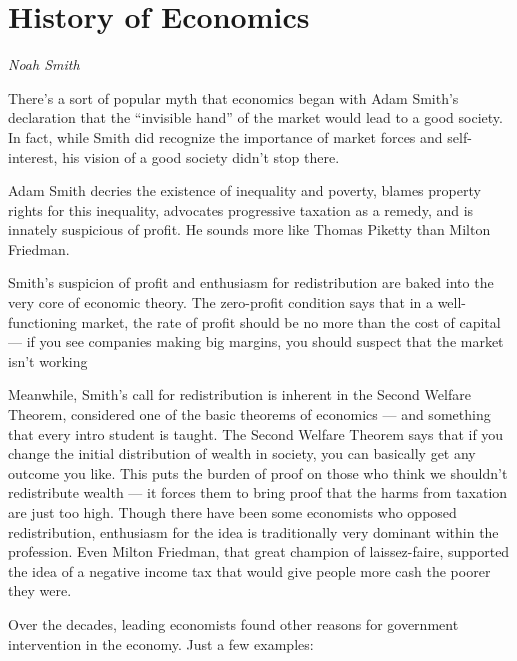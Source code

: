 \documentclass[
]{book}
\begin{document}
\hypertarget{history-of-economics}{%
\section{History of Economics}\label{history-of-economics}}

\emph{Noah Smith}

There's a sort of popular myth that economics began with Adam Smith's declaration that the ``invisible hand'' of the market would lead to a good society. In fact, while Smith did recognize the importance of market forces and self-interest, his vision of a good society didn't stop there.

Adam Smith decries the existence of inequality and poverty, blames property rights for this inequality, advocates progressive taxation as a remedy, and is innately suspicious of profit. He sounds more like Thomas Piketty than Milton Friedman.

Smith's suspicion of profit and enthusiasm for redistribution are baked into the very core of economic theory. The zero-profit condition says that in a well-functioning market, the rate of profit should be no more than the cost of capital --- if you see companies making big margins, you should suspect that the market isn't working

Meanwhile, Smith's call for redistribution is inherent in the Second Welfare Theorem, considered one of the basic theorems of economics --- and something that every intro student is taught. The Second Welfare Theorem says that if you change the initial distribution of wealth in society, you can basically get any outcome you like. This puts the burden of proof on those who think we shouldn't redistribute wealth --- it forces them to bring proof that the harms from taxation are just too high. Though there have been some economists who opposed redistribution, enthusiasm for the idea is traditionally very dominant within the profession. Even Milton Friedman, that great champion of laissez-faire, supported the idea of a negative income tax that would give people more cash the poorer they were.

Over the decades, leading economists found other reasons for government intervention in the economy. Just a few examples:
\end{document}
